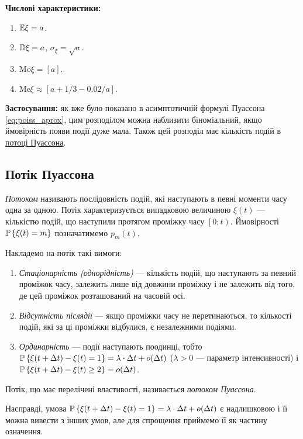 \noindent\textbf{Числові характеристики:}
\begin{enumerate}
    \item $\E\xi = a$.
    \item $\D\xi = a$, $\sigma_\xi = \sqrt{a}$.
    \item $\mathrm{Mo}\xi = \left[a\right]$.
    \item $\mathrm{Me}\xi \approx \left[a + 1/3 - 0.02/a\right]$.
\end{enumerate}

\noindent\textbf{Застосування:} як вже було показано в асимптотичній формулі Пуассона \eqref{eq:poiss_aprox},
цим розподілом можна наблизити біноміальний, якщо ймовірність появи події дуже мала. Також цей розподіл
має кількість подій в \hyperref[poiss_proc]{потоці Пуассона}.

\subsection{Потік Пуассона}\label{poiss_proc}
\emph{Потоком} називають послідовність подій, які наступають в певні моменти часу одна за одною.
Потік характеризується випадковою величиною $\xi(t)$ --- 
кількістю подій, що наступили протягом проміжку часу $\left[ 0; t\right)$.
Ймовірності $\P\left\{\xi(t) = m\right\}$ позначатимемо $p_m(t)$.

Накладемо на потік такі вимоги:
\begin{enumerate}
    \item \emph{Стаціонарність (однорідність)} --- кількість подій, що наступають
    за певний проміжок часу, залежить лише від довжини проміжку і не залежить
    від того, де цей проміжок розташований на часовій осі.
    \item \emph{Відсутність післядії} --- якщо проміжки часу не перетинаються, то кількості подій,
    які за ці проміжки відбулися, є незалежними подіями.
    \item \emph{Ординарність} --- події наступають поодинці, тобто
    $\P\left\{\xi(t+\Delta t) - \xi(t) = 1\right\} = \lambda\cdot\Delta t + o(\Delta t)$
    ($\lambda > 0$ --- параметр інтенсивності) і 
    $\P\left\{\xi(t+\Delta t) - \xi(t) \geq 2\right\} = o(\Delta t)$.
\end{enumerate}
\begin{definition}
    Потік, що має перелічені властивості, називається \emph{потоком Пуассона}.
\end{definition}
\begin{remark}
    Насправді, умова $\P\left\{\xi(t+\Delta t) - \xi(t) = 1\right\} = \lambda\cdot\Delta t + o(\Delta t)$
    є надлишковою і її можна вивести з інших умов, але для спрощення приймемо її як частину означення.
\end{remark}

